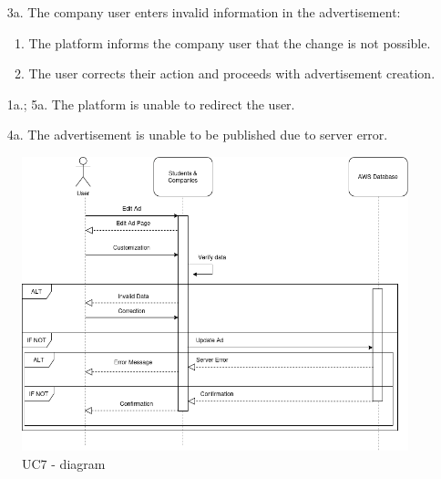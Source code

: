 \begin{itemize}[label={[\textbf{UC}]}, align=left, leftmargin=*]
\begin{enumerate}[label=\arabic*.]
        \item[3a.] The company user enters invalid information in the advertisement:
            \begin{enumerate}[label=\arabic*.]
                \item The platform informs the company user that the change is not possible.
                \item The user corrects their action and proceeds with advertisement creation.
            \end{enumerate}
        \item[1a.; 5a.] The platform is unable to redirect the user.
        \item[4a.] The advertisement is unable to be published due to server error.
        \end{enumerate}

     \begin{figure}[H]
    	\includegraphics[width=\textwidth,height=\textheight,keepaspectratio]{RASD-Latex/assets/Use Case Diagrams/UC7.png}
    	\caption{UC7 - diagram}
    	\label{fig:DataRequest}
    \end{figure}
     

\end{itemize}

